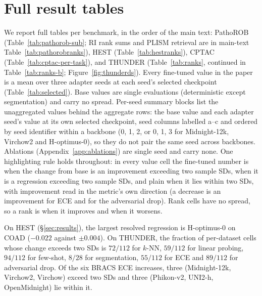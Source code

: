 \section{Full result tables}
\renewcommand{\floatpagefraction}{0.5}

We report full tables per benchmark, in the order of the main text: PathoROB (Table~\ref{tab:pathorob-sub}; RI rank sums and PLISM retrieval are in main-text Table~\ref{tab:pathorobranks}), HEST (Table~\ref{tab:hestranks}), CPTAC (Table~\ref{tab:cptac-per-task}), and THUNDER (Table~\ref{tab:ranks}, continued in Table~\ref{tab:ranks-b}; Figure~\ref{fig:thunderds}).
Every fine-tuned value in the paper is a mean over three adapter seeds at each seed's selected checkpoint (Table~\ref{tab:selected}). Base values are single evaluations (deterministic except segmentation) and carry no spread. Per-seed summary blocks list the unaggregated values behind the aggregate rows: the base value and each adapter seed's value at its own selected checkpoint, seed columns labelled a--c and ordered by seed identifier within a backbone (0, 1, 2, or 0, 1, 3 for Midnight-12k, Virchow2 and H-optimus-0), so they do not pair the same seed across backbones. Ablations (Appendix~\ref{app:ablations}) are single seed and carry none.
One highlighting rule holds throughout: in every value cell the fine-tuned number is
 when the change from base is an improvement exceeding two sample SDs, 
when it is a regression exceeding two sample SDs, and plain when it lies within two SDs, with
improvement read in the metric's own direction (a decrease is an improvement for ECE and for
the adversarial drop). Rank cells have no spread, so a rank is  when it improves and
 when it worsens.

On HEST (\S\ref{sec:results}), the largest resolved regression is H-optimus-0 on COAD ($-0.022$ against $\pm0.004$). On THUNDER, the fraction of per-dataset cells whose change exceeds two SDs is $72/112$ for $k$-NN, $59/112$ for linear probing, $94/112$ for few-shot, $8/28$ for segmentation, $55/112$ for ECE and $89/112$ for adversarial drop. Of the six BRACS ECE increases, three (Midnight-12k, Virchow2, Virchow) exceed two SDs and three (Phikon-v2, UNI2-h, OpenMidnight) lie within it.

